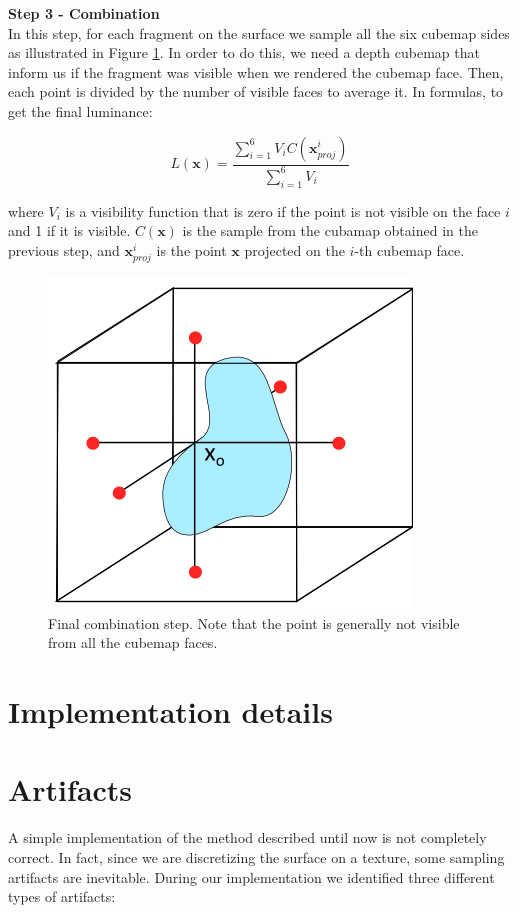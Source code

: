 \FloatBarrier
\textbf{Step 3 - Combination} \\
In this step, for each fragment on the surface we sample all the six cubemap sides as illustrated in Figure \ref{fig:step3}. In order to do this, we need a depth cubemap that inform us if the fragment was visible when we rendered the cubemap face. Then, each point is divided by the number of visible faces to average it. In formulas, to get the final luminance:

$$
L(\mathbf{x}) = \frac{\sum_{i = 1}^{6}V_{i}C(\mathbf{x}_{proj}^i)}{\sum_{i = 1}^{6}V_{i}}
$$

where $V_{i}$ is a visibility function that is zero if the point is not visible on the face $i$ and 1 if it is visible. $C(\mathbf{x})$ is the sample from the cubamap obtained in the previous step, and $\mathbf{x}_{proj}^i$ is the point $\mathbf{x}$ projected on the $i$-th cubemap face.

\begin{figure}[!ht]
\centering
\includegraphics[width=0.5 \linewidth]{images/method/method_step3}
\caption{Final combination step. Note that the point is generally not visible from all the cubemap faces.}
\label{fig:step3}
\end{figure} 

\clearpage
\section{Implementation details}

\section{Artifacts}
A simple implementation of the method described until now is not completely correct. In fact, since we are discretizing the surface on a texture, some sampling artifacts are inevitable. During our implementation we identified three different types of artifacts:

